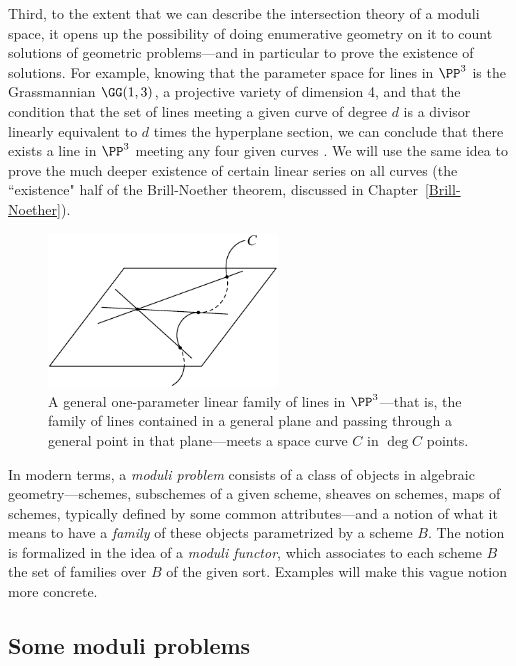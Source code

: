 Third, to the extent that we can describe the intersection theory of a moduli space, it opens up the possibility of doing enumerative geometry on it to count solutions of geometric problems---and in particular to prove the existence of solutions. For example, knowing that the parameter space for lines in $\PP^3$ is the Grassmannian $\GG(1,3)$, a projective variety of dimension 4, and that the condition that the set of lines meeting a given curve of degree $d$
is a divisor linearly equivalent to  $d$ times the hyperplane section, we can conclude  that there exists a line in $\PP^3$ meeting any four given curves \cite[Section 3.4.1]{3264}. We will use the same idea to prove the much deeper existence of certain linear series on all curves (the ``existence" half of the Brill-Noether theorem, discussed in Chapter~\ref{Brill-Noether}). 

\begin{figure}
\centerline {\includegraphics[height=1.6in]{"main/Fig06-2"}}
 \caption{A general  one-parameter linear family of lines in $\PP^3$---that is, the family of lines
 contained in a general plane and passing through a general point in that plane---meets a space curve $C$ in
 $\deg C$ points.}
\end{figure}

In modern terms, a \emph{moduli problem} consists of a class of objects in algebraic geometry---schemes, subschemes of a given scheme, sheaves on schemes, maps of schemes, typically defined by some common attributes---and a notion of what it means to have a \emph{family} of these objects parametrized by a scheme $B$. The notion is formalized in the idea of a \emph{moduli functor}, 
which associates to each scheme $B$ the set of families over $B$ of the given sort. Examples will make this vague notion more concrete.

\subsection{Some moduli problems}

